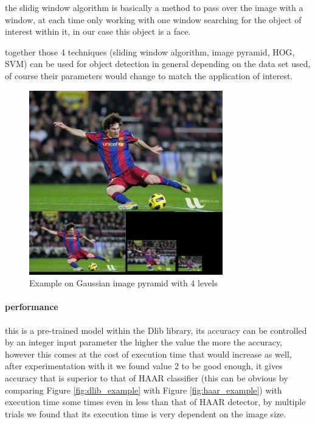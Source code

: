 the slidig window algorithm is basically a method to pass over the image with a window, at each time only working with one window searching for the object of interest within it, in our case this object is a face.

together those 4 techniques (sliding window algorithm, image pyramid, HOG, SVM) can be used for object detection in general depending on the data set used, of course their parameters would change to match the application of interest.

\begin{figure}
	\centering
	\includegraphics[width=0.75\textwidth]{images/gaussian_pyramid.jpg}
	\caption{Example on Gaussian image pyramid with 4 levels}
	\label{fig:gaussian_pyramid}
\end{figure}

\paragraph{performance}
this is a pre-trained model within the Dlib library, its accuracy can be controlled by an integer input parameter the higher the value the more the accuracy, however this comes at the cost of execution time that would increase as well, after experimentation with it we found value 2 to be good enough, it gives accuracy that is superior to that of HAAR classifier (this can be obvious by comparing Figure \ref{fig:dlib_example} with Figure \ref{fig:haar_example}) with execution time some times even in less than that of HAAR detector, by multiple trials we found that its execution time is very dependent on the image size.


